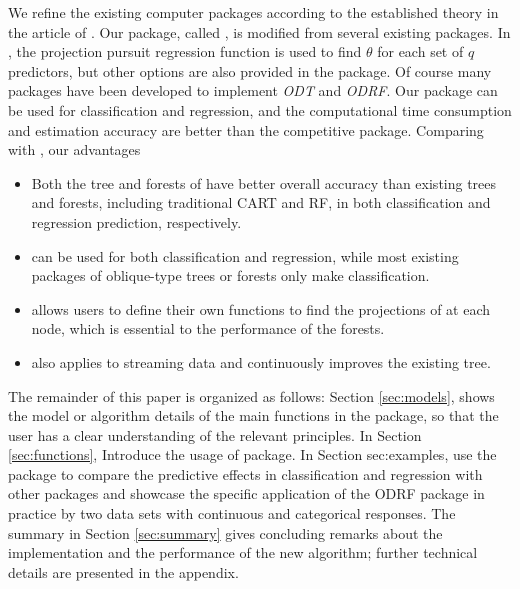\documentclass[nojss]{jss}
\numberwithin{equation}{section}
\begin{document}
We refine the existing computer   \citep{R} packages according to the established theory in the article of \cite{zhan2022consistency}. Our package, called , is modified from several existing  packages.
In , the projection pursuit regression function is used to find $ \theta $ for each set of $ q $ predictors, but other options are also provided in the package. Of course many   packages have been developed  to implement \emph{ODT} and \emph{ODRF}.
Our   package can be used for classification and regression, and the computational time consumption and estimation accuracy are better than the competitive  package. Comparing with , our advantages
\begin{itemize}

\item Both the tree and forests of  have better overall accuracy than existing trees and forests, including traditional CART and RF, in both classification and regression prediction, respectively.


\item {} can be used for both classification and regression, while most existing packages of oblique-type trees or forests only make classification.

\item {} allows users to define their own functions to find the projections of at each node, which is essential to the performance of the forests.

\item {} also applies to streaming data and continuously improves the existing tree.

\end{itemize}


The remainder of this paper is organized as follows: Section \ref{sec:models}, shows the model or algorithm details of the main functions in the  package, so that the user has a clear understanding of the relevant principles. In Section \ref{sec:functions}, Introduce the usage of  package. In Section {sec:examples}, use the  package to compare the predictive effects in classification and regression with other  packages and showcase the specific application of the ODRF package in practice by two data sets with continuous and categorical responses. The summary in Section \ref{sec:summary} gives concluding remarks about the implementation and the performance of the new algorithm; further technical details are presented in the appendix.
\end{document}
